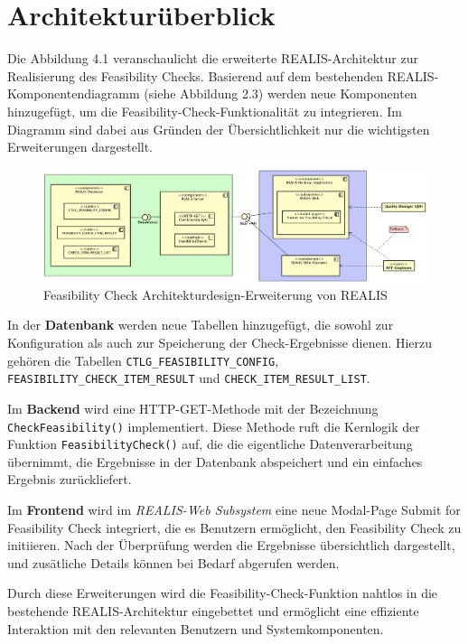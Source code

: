 \section{Architekturüberblick}

Die Abbildung 4.1 veranschaulicht die erweiterte REALIS-Architektur zur Realisierung des Feasibility Checks. Basierend auf dem bestehenden REALIS-Komponentendiagramm (siehe Abbildung 2.3) werden neue Komponenten hinzugefügt, um die Feasibility-Check-Funktionalität zu integrieren. Im Diagramm sind dabei aus Gründen der Übersichtlichkeit nur die wichtigsten Erweiterungen dargestellt.

\begin{figure}[!htbp]
    \centering
    \includegraphics[width=1\textwidth]{bilder/KomponentenDiagramm-REALIS-mitErweiterungen.png}
    \caption{Feasibility Check Architekturdesign-Erweiterung von \gls{REALIS}}
    \label{fig:feasibility-check-komponentendiagramm}
\end{figure}


In der \textbf{Datenbank} werden neue Tabellen hinzugefügt, die sowohl zur Konfiguration als auch zur Speicherung der Check-Ergebnisse dienen. Hierzu gehören die Tabellen \texttt{CTLG\_FEASIBILITY\_CONFIG}, \texttt{FEASIBILITY\_CHECK\_ITEM\_RESULT} und \texttt{CHECK\_ITEM\_\-RESULT\_\-LIST}.

Im \textbf{Backend} wird eine HTTP-GET-Methode mit der Bezeichnung \texttt{CheckFeasibility()} implementiert. Diese Methode ruft die Kernlogik der Funktion \texttt{FeasibilityCheck()} auf, die die eigentliche Datenverarbeitung übernimmt, die Ergebnisse in der Datenbank abspeichert und ein einfaches Ergebnis zurückliefert.

Im \textbf{Frontend} wird im \textit{REALIS-Web Subsystem} eine neue Modal-Page \glqq Submit for Feasibility Check\grqq{} integriert, die es Benutzern ermöglicht, den Feasibility Check zu initiieren. Nach der Überprüfung werden die Ergebnisse übersichtlich dargestellt, und zusätliche Details können bei Bedarf abgerufen werden. 

Durch diese Erweiterungen wird die Feasibility-Check-Funktion nahtlos in die bestehende REALIS-Architektur eingebettet und ermöglicht eine effiziente Interaktion mit den relevanten Benutzern und Systemkomponenten.


